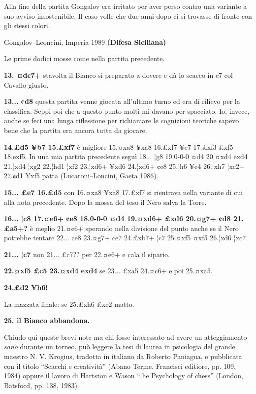 Alla fine della partita Gongalov era irritato per aver perso contro una
variante a suo avviso insostenibile. Il caso volle che due anni dopo ci
si trovasse di fronte con gli stessi colori.

Gongalov--Leoncini, Imperia 1989 \textbf{(Difesa Siciliana)}

Le prime dodici mosse come nella partita precedente.

\textbf{13. ¤dc7+} stavolta il Bianco si preparato a dovere e dà lo
scacco in c7 col Cavallo giusto.

\textbf{13... ¢d8} questa partita venne giocata all'ultimo turno ed era
di rilievo per la classifica. Seppi poi che a questo punto molti mi
davano per spacciato. Io, invece, anche se feci una lunga riflessione
per richiamare le cognizioni teoriche sapevo bene che la partita era
ancora tutta da giocare.

\textbf{14.£d5 ¥b7 15.£xf7} è migliore 15.¤xa8 ¥xa8 16.£xf7 ¥e7 17.£xf3
£xf5 18.exf5. In una mia partita precedente seguì 18... ¦g8 19.0-0-0 ¤d4
20.¤xd4 exd4 21.¦xd4 ¦xg2 22.¦hd1 ¦xf2 23.¦xd6+ ¥xd6 24.¦xd6+ ¢e8 25.¦h6
¥e4 26.¦xh7 ¦xc2+ 27.¢d1 ¥xf5 patta (Lucaroni--Loncini, Gaeta 1986).

\textbf{15... £e7 16.£d5} con 16.¤xa8 ¥xa8 17.£xf7 si rientrava nella
variante di cui alla nota precedente. Dopo la mossa del teso il Nero
salva la Torre.

\textbf{16... ¦c8 17.¤e6+ ¢e8 18.0-0-0 ¤d4 19.¤xd6+ £xd6 20.¤g7+ ¢d8
21.£a5+?} è meglio 21.¤e6+ sperando nella divisione del punto anche se
il Nero potrebbe tentare 22... ¢e8 23.¤g7+ ¢e7 24.£xb7+ ¦c7 25.¤xf5 ¤xf5
26.¦xd6 ¦xc7.

\textbf{21... ¦c7} non 21... £c7?? per 22.¤e6+ e cala il sipario.

\textbf{22.¤xf5 £c5 23.¤xd4 exd4} se 23... £xa5 24.¤c6+ e poi 25.¤xa5.

\textbf{24.£d2 ¥h6!}


La mazzata finale: se 25.£xh6 £xc2 matto.

\textbf{25. il Bianco abbandona.}

Chiudo qui queste brevi note ma chi fosse interessato ad avere un
atteggiamento \emph{sano} durante un torneo, può leggere la tesi di
laurea in psicologia del grande maestro N. V. Krogius, tradotta in
italiano da Roberto Paniagua, e pubblicata con il titolo ``Scacchi e
creatività'' (Abano Terme, Francisci editiore, pp. 109, 1984) oppure il
lavoro di Hartston e Wason ``¦he Psychology of chess'' (London,
Batsfo¢d, pp. 138, 1983).

